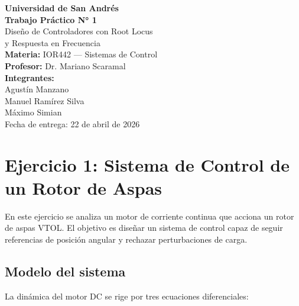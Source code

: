 \documentclass[12pt, a4paper]{article}
\begin{document}

\begin{titlepage}
\centering
\vspace*{2cm}
{\Large\textbf{Universidad de San Andrés}}\\
\vspace{2.5cm}
{\LARGE\textbf{Trabajo Práctico N° 1}}\\\vspace{0.3cm}
{\Large Diseño de Controladores con Root Locus\\y Respuesta en Frecuencia}\\
\vspace{2cm}
{\large\textbf{Materia:} IOR442 — Sistemas de Control}\\
{\large\textbf{Profesor:} Dr. Mariano Scaramal}\\
\vspace{1.5cm}
{\large\textbf{Integrantes:}}\\
\vspace{0.3cm}
Agustín Manzano\\
Manuel Ramírez Silva\\
Máximo Simian\\
\vspace{2cm}
{\large Fecha de entrega: 22 de abril de 2026}

\end{titlepage}

\section{Ejercicio 1: Sistema de Control de un Rotor de Aspas}

En este ejercicio se analiza un motor de corriente continua que acciona un rotor de aspas VTOL. El objetivo es diseñar un sistema de control capaz de seguir referencias de posición angular y rechazar perturbaciones de carga.

\subsection{Modelo del sistema}

La dinámica del motor DC se rige por tres ecuaciones diferenciales:
\end{document}

